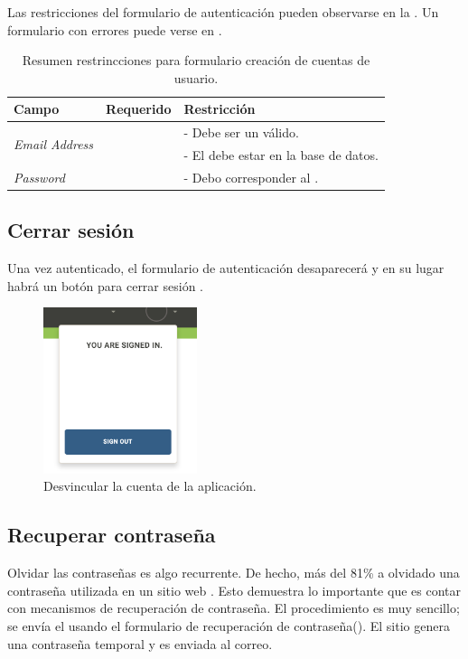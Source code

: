 Las restricciones del formulario de autenticación pueden observarse en la . Un formulario con errores puede verse en .

\begin{table}[H]
    \centering
	\begin{tabular}{ |l|c||l| }
		\hline Campo & Requerido & Restricción \\ \hline
		\multirow{2}{*}{\textit{Email Address}} &  \multirow{2}{*}{\checkmark}
				& - Debe ser un \email válido. \\ 
			& 	& - El \email debe estar en la base de datos. \\ \hline
		\multirow{1}{*}{\textit{Password}} 		&  \multirow{1}{*}{\checkmark} & - Debo corresponder al \email. \\ \hline
	\end{tabular}
 	\caption{Resumen restrincciones para formulario creación de cuentas de usuario.}
    \label{tab:architecture:accounts:signin:form}
\end{table}

\subsection{Cerrar sesión}

Una vez autenticado, el formulario de autenticación desaparecerá y en su lugar habrá un botón para cerrar sesión .

\begin{figure}[H]
	\centering
	\includegraphics[width=0.4\textwidth]{figuras/architecture/accounts/logout/ui.png}
	\caption{Desvincular la cuenta de la aplicación.}
	\label{figure:architecture:accounts:logout:ui}
\end{figure}

\subsection{Recuperar contraseña}
Olvidar las contraseñas es algo recurrente. De hecho, más del 81\% a olvidado una contraseña utilizada en un sitio web \cite{online_berkeley_behavior_toward_password}. Esto demuestra lo importante que es contar con mecanismos de recuperación de contraseña.
El procedimiento es muy sencillo; se envía el \email usando el formulario de recuperación de contraseña(). El sitio genera una contraseña temporal y es enviada al correo.

